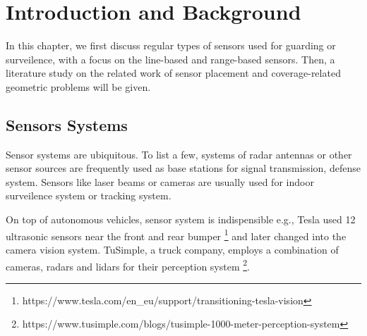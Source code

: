 
\chapter{Introduction and Background} 
\thispagestyle{myheadings} 
In this chapter, we first discuss regular types of sensors used for guarding or surveilence, 
with a focus on the line-based and range-based sensors. 
Then, a literature study on the related work of sensor placement and 
coverage-related geometric problems will be given. 
\section{Sensors Systems} 
Sensor systems are ubiquitous. To list a few, systems of radar antennas 
or other sensor sources are frequently used as base stations for signal transmission, 
defense system.
Sensors like laser beams or cameras are usually used for indoor surveilence system or tracking system.

On top of autonomous vehicles, sensor system is indispensible 
e.g., Tesla used 12 ultrasonic sensors
near the front and rear bumper \footnote{https://www.tesla.com/en\_eu/support/transitioning-tesla-vision} 
and later changed into the camera vision system. 
TuSimple, a truck company, employs a combination of cameras, radars and lidars
for their perception system \footnote{https://www.tusimple.com/blogs/tusimple-1000-meter-perception-system}.

